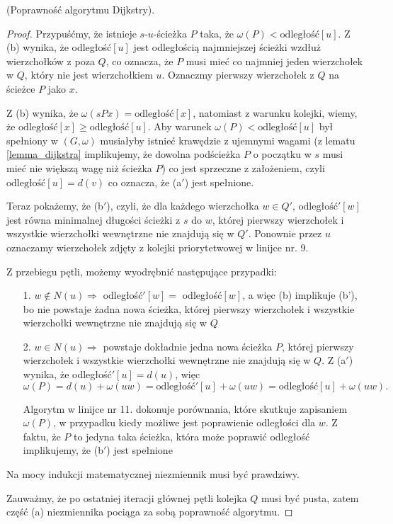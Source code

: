 \begin{theorem}{(Poprawność algorytmu Dijkstry).}
\begin{proof}
		Przypuśćmy, że istnieje 
		$s$-$u$-ścieżka $P$ taka, że $\omega(P) < \text{odległość}[u]$. 
		Z (b) wynika, że odległość$[u]$ jest odległością 
		najmniejszej ścieżki wzdłuż wierzchołków z poza $Q$, co
		oznacza, że $P$ musi mieć co najmniej jeden wierzchołek 
		w $Q$, który nie jest wierzchołkiem $u$. 
		Oznaczmy pierwszy wierzchołek z $Q$ na ścieżce $P$ jako $x$. 
		
		Z (b) wynika, że $\omega(sPx) = \text{odległość}[x]$, natomiast
		z warunku kolejki, wiemy, że
		$\text{odległość}[x] \geq \text{odległość}[u]$. Aby 
		warunek $\omega(P) < \text{odległość}[u]$ był spełniony
		w $(G, \omega)$ musiałyby istnieć krawędzie 
		z ujemnymi wagami (z lematu \ref{lemma_dijkstra} implikujemy, że
		dowolna podścieżka $P$ o początku w $s$
		musi mieć nie większą wagę niż ścieżka $P$) co jest sprzeczne z założeniem, czyli
		$\text{odległość}[u] = d(v)$
		co oznacza, że (a$'$) jest spełnione.
		
		Teraz pokażemy, że (b$'$), czyli, że
		dla każdego wierzchołka $w \in Q'$, 
		$\text{odległość}'[w]$ jest równa minimalnej długości
		ścieżki z $s$ do $w$, której pierwszy wierzchołek i 
		wszystkie wierzchołki wewnętrzne 
		nie znajdują się w $Q'$. Ponownie 
		przez $u$ oznaczamy wierzchołek
		zdjęty z kolejki priorytetwowej w linijce nr. 9.
		
		Z przebiegu pętli, możemy wyodrębnić następujące 
		przypadki: 
		\begin{itemize}
			\item[1.] $w \not \in N(u) \Rightarrow$ 
			odległość$'[w]=$ odległość$[w]$, a więc (b) 
			implikuje (b'), bo nie powstaje żadna nowa ścieżka, 
			której pierwszy wierzchołek i wszystkie wierzchołki
			wewnętrzne nie znajdują się w $Q$
			\item[2.] $w \in N(u) \Rightarrow$ 
			powstaje dokładnie jedna nowa ścieżka $P$, 
			której pierwszy wierzchołek i wszystkie wierzchołki
			wewnętrzne nie znajdują się w $Q$. Z (a$'$) wynika, że
			odległość$'[u] = d(u)$, więc 
			\[\omega(P) = d(u) + \omega(uw) = \text{odległość}'[u] + \omega(uw) = \text{odległość}[u] + \omega(uw).\]
			
			Algorytm w linijce nr 11. dokonuje porównania, które 
			skutkuje zapisaniem $\omega(P)$, w przypadku
			kiedy możliwe jest poprawienie odległości dla $w$. Z faktu, że
			$P$ to jedyna taka ścieżka, która może poprawić odległość
			implikujemy, że (b$'$) jest spełnione
		\end{itemize}
		
		
		
		Na mocy indukcji matematycznej niezmiennik musi być prawdziwy.
		
		Zauważmy, że po ostatniej iteracji głównej pętli kolejka $Q$ musi być pusta,
		zatem część (a) niezmiennika pociąga za sobą
		poprawność algorytmu.
	\end{proof}
	\label{dijkstra_proof}
\end{theorem}


